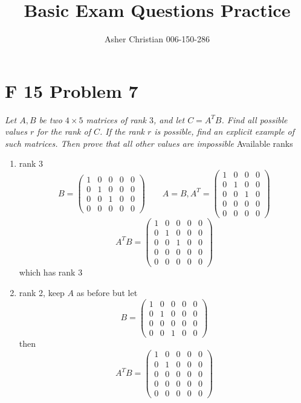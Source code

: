 \documentclass{article}
\title{Basic Exam Questions Practice}
\author{Asher Christian 006-150-286}
\date{}
\begin{document}
\section{F 15 Problem 7}
\emph{
    Let $A,B$ be two $4 \times 5$ matrices of rank $3$, and let $C = A^{T}B$. Find all possible values $r$ for the rank of $C$.
    If the rank $r$ is possible, find an explicit example of such matrices. Then prove that all other values are impossible
}
Available ranks
\begin{enumerate}
    \item rank 3
        \[
            B = \begin{pmatrix} 1 & 0 & 0 & 0 & 0 \\ 0 & 1 & 0 & 0 & 0 \\ 0 & 0 & 1 & 0 & 0 \\ 0 & 0 & 0 & 0 & 0 \end{pmatrix} \qquad A = B, A^{T} = \begin{pmatrix} 1 & 0 & 0 & 0 \\ 0 & 1 & 0 & 0 \\ 0 & 0 & 1 & 0 \\ 0 & 0 & 0 & 0 \\ 0 & 0 & 0 & 0 \end{pmatrix} 
        \] 
        \[
            A^{T}B = \begin{pmatrix} 1 & 0 & 0 & 0 & 0 \\ 0 & 1 & 0 & 0 & 0 \\ 0 & 0 & 1 & 0 & 0 \\ 0 & 0 & 0 & 0 & 0 \\ 0 & 0 & 0 & 0 & 0 \end{pmatrix} 
        \] 
        which has rank 3
    \item rank 2, keep $A$ as before but let
        \[
            B = \begin{pmatrix} 1 & 0 & 0 & 0 & 0 \\ 0 & 1 & 0 & 0 & 0 \\ 0 & 0 & 0 & 0 & 0 \\ 0 & 0 & 1 & 0 & 0 \end{pmatrix} 
        \] 
        then
        \[
            A^{T}B = \begin{pmatrix} 1 & 0 & 0 & 0 & 0 \\ 0 & 1 & 0 & 0 & 0 \\ 0 & 0 & 0 & 0 & 0 \\ 0 & 0 & 0 & 0 & 0 \\ 0 & 0 & 0 & 0 & 0  \end{pmatrix} 
        \] 
\end{enumerate}
\end{document}
